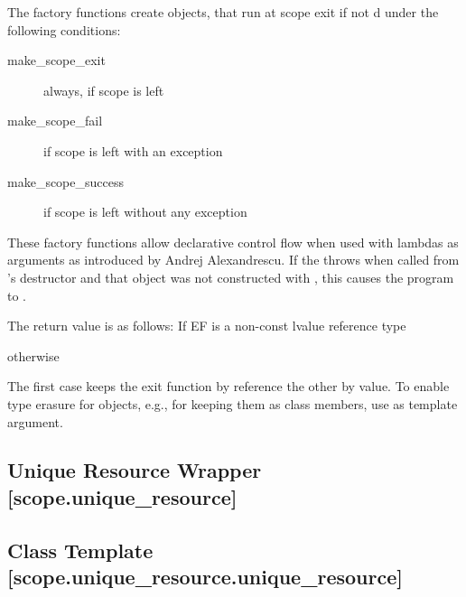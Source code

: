 \documentclass[ebook,11pt,article]{memoir}
\begin{document}
\begin{itemdescr}
\pnum
The factory functions create  objects, that run  at scope exit if not d under the following conditions:
\begin{description}
\item[make_scope_exit ] always, if scope is left
\item[make_scope_fail ] if scope is left with an exception
\item[make_scope_success ] if scope is left without any exception
\end{description}
\pnum
\enternote
These factory functions allow declarative control flow when used with lambdas as arguments as introduced by Andrej Alexandrescu. If the  throws when called from 's destructor and that object was not constructed with , this causes the program to .
\exitnote

\pnum
The return value is as follows: If EF is a non-const lvalue reference type 

\pnum
\returns {}

\pnum
otherwise

\pnum
\returns {}

\pnum
\enternote
The first case keeps the exit function by reference the other by value. To enable type erasure for  objects, e.g., for keeping them as class members, use  as template argument.
\exitnote
\end{itemdescr}




\subsection{Unique Resource Wrapper [scope.unique_resource]}

\subsection {Class Template  [scope.unique_resource.unique_resource]}
\end{document}
